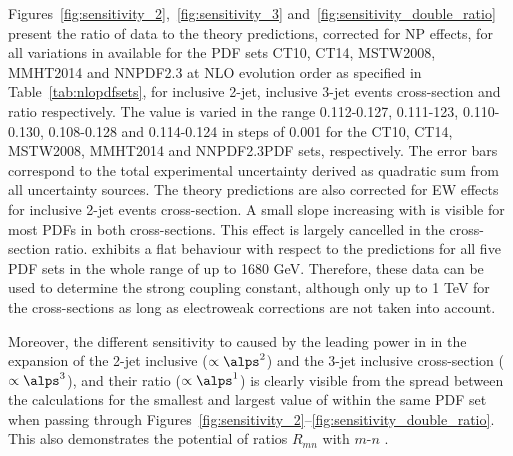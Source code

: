 Figures~\ref{fig:sensitivity_2},~\ref{fig:sensitivity_3} and~\ref{fig:sensitivity_double_ratio} present the ratio of data to the theory predictions, corrected for NP effects, for all variations in \alpsmz available for the PDF sets CT10, CT14, MSTW2008, MMHT2014 and NNPDF2.3 at NLO evolution order as specified in Table~\ref{tab:nlopdfsets}, for inclusive 2-jet, inclusive 3-jet events cross-section and ratio \ratio respectively. The \alpsmz value is varied in the range 0.112-0.127, 0.111-123, 0.110-0.130, 0.108-0.128 and 0.114-0.124 in steps of 0.001 for the CT10, CT14, MSTW2008, MMHT2014 and NNPDF2.3PDF sets, respectively. The error bars correspond to the total experimental uncertainty derived as quadratic sum from all uncertainty sources. The theory predictions are also corrected for EW effects for inclusive 2-jet events cross-section. A small slope increasing with \httwo is visible for most PDFs in both cross-sections. This effect is largely cancelled in the cross-section ratio. \ratio exhibits a flat behaviour with respect to the predictions for all five PDF sets in the whole range of \httwo up to 1680 GeV. Therefore, these data can be used to determine the strong coupling constant, although only up to 1 TeV for the cross-sections as long as electroweak corrections are not taken into account.

Moreover, the different sensitivity to \alpsmz caused by the leading power in \alps in the expansion of the 2-jet inclusive ($\propto\alps^2$) and the 3-jet inclusive cross-section ($\propto\alps^3$), and their ratio ($\propto\alps^1$) is clearly visible from the spread between the calculations for the smallest and largest value of \alpsmz within the same PDF set when passing through Figures~\ref{fig:sensitivity_2}--\ref{fig:sensitivity_double_ratio}.  This also demonstrates the potential of ratios $R_{mn}$ with $m$-$n$ .

